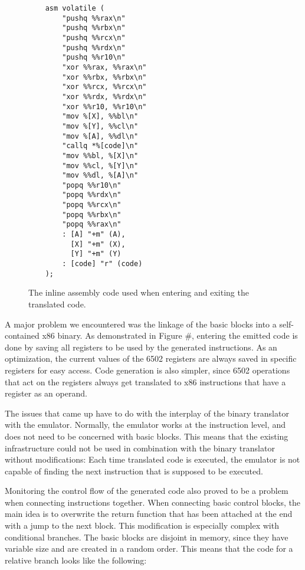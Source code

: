 \begin{figure}[!h]
\begin{lstlisting}
    asm volatile (
        "pushq %%rax\n"
        "pushq %%rbx\n"
        "pushq %%rcx\n"
        "pushq %%rdx\n"
        "pushq %%r10\n"
        "xor %%rax, %%rax\n"
        "xor %%rbx, %%rbx\n"
        "xor %%rcx, %%rcx\n"
        "xor %%rdx, %%rdx\n"
        "xor %%r10, %%r10\n"
        "mov %[X], %%bl\n"
        "mov %[Y], %%cl\n"
        "mov %[A], %%dl\n"
        "callq *%[code]\n"
        "mov %%bl, %[X]\n"
        "mov %%cl, %[Y]\n"
        "mov %%dl, %[A]\n"
        "popq %%r10\n"
        "popq %%rdx\n"
        "popq %%rcx\n"
        "popq %%rbx\n"
        "popq %%rax\n"
        : [A] "+m" (A),
          [X] "+m" (X), 
          [Y] "+m" (Y) 
        : [code] "r" (code)
    );
\end{lstlisting}
	\caption {The inline assembly code used when entering and exiting the translated code.}
\end{figure}
 
A major problem we encountered was the linkage of the basic blocks into a self-contained x86 binary. 
As demonstrated in Figure \#, entering the emitted code is done by saving all registers to be used by the generated instructions.
As an optimization, the current values of the 6502 registers are always saved in specific registers for easy access.
Code generation is also simpler, since 6502 operations that act on the registers always get translated to x86 instructions that have a register as an operand.

The issues that came up have to do with the interplay of the binary translator with the emulator.
Normally, the emulator works at the instruction level, and does not need to be concerned with basic blocks.
This means that the existing infrastructure could not be used in combination with the binary translator without modifications:
Each time translated code is executed, the emulator is not capable of finding the next instruction that is supposed to be executed.

Monitoring the control flow of the generated code also proved to be a problem when connecting instructions together.
When connecting basic control blocks, the main idea is to overwrite the return function that has been attached at the end with a jump to the next block. 
This modification is especially complex with conditional branches. 
The basic blocks are disjoint in memory, since they have variable size and are created in a random order.
This means that the code for a relative branch looks like the following:

